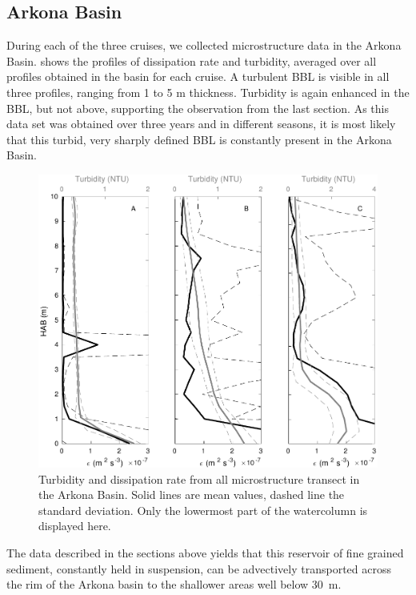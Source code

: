 \FloatBarrier
\subsection{Arkona Basin}

 During each of the three cruises, we collected microstructure data in the 
Arkona Basin.  shows the profiles of dissipation rate and turbidity, 
averaged over all profiles obtained in the basin for each cruise. A turbulent 
BBL is visible in all three profiles, ranging from 1 to 5 m thickness. 
Turbidity is again enhanced in the BBL, but not above, supporting the 
observation from the last section. As this data set was obtained over three 
years and in different seasons, it is most likely that this turbid, very 
sharply defined BBL is constantly present in the Arkona Basin.

   \begin{figure}[ht]
\includegraphics[width=15cm]{bilder/arkona_mss.pdf}
 \caption{Turbidity and dissipation rate from all microstructure transect in 
the Arkona Basin. Solid lines are mean values, dashed line the standard 
deviation. Only the lowermost part of the watercolumn is displayed here.}
 \label{abmss}
 \end{figure}

The data described in the sections above yields that this reservoir of fine 
grained sediment, constantly held in suspension, can be advectively 
transported across the rim of the Arkona basin to the shallower areas well 
below 30~m. 

